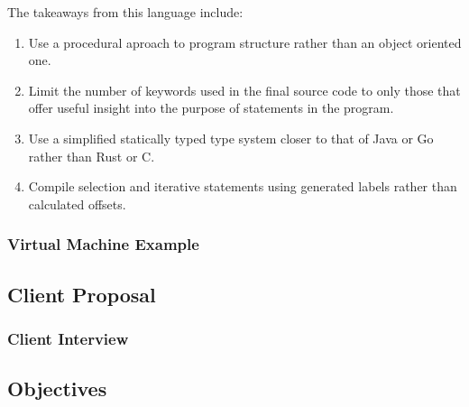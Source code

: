 The takeaways from this language include:
\begin{enumerate}
    \item Use a procedural aproach to program structure rather than an object oriented one.
    \item Limit the number of keywords used in the final source code to only those that offer useful insight into the purpose of statements in the program.
    \item Use a simplified statically typed type system closer to that of Java or Go rather than Rust or C.
    \item Compile selection and iterative statements using generated labels rather than calculated offsets.
\end{enumerate}

\subsubsection{Virtual Machine Example}

\subsection{Client Proposal}
\subsubsection{Client Interview}
\subsection{Objectives}